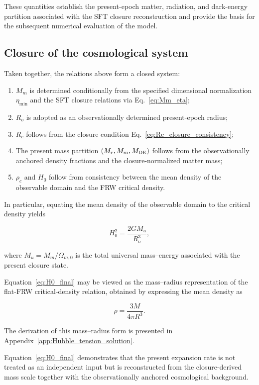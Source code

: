\documentclass[12pt]{article}
\begin{document}
These quantities establish the present-epoch matter, radiation, and
dark-energy partition associated with the SFT closure reconstruction and
provide the basis for the subsequent numerical evaluation of the model.


\subsection{Closure of the cosmological system}

Taken together, the relations above form a closed system:
\begin{enumerate}
\item $M_m$ is determined conditionally from the specified dimensional
normalization $\eta_{\min}$ and the SFT closure relations via
Eq.~\eqref{eq:Mm_eta};
\item $R_o$ is adopted as an observationally determined present-epoch
radius;
\item $R_c$ follows from the closure condition
Eq.~\eqref{eq:Rc_closure_consistency};
\item The present mass partition
\(
(M_r, M_m, M_{\rm DE})
\)
follows from the observationally anchored density fractions and the
closure-normalized matter mass;
\item \(\rho_c\) and \(H_0\) follow from consistency between the mean density
of the observable domain and the FRW critical density.

\end{enumerate}

In particular, equating the mean density of the observable domain to the
critical density yields

\begin{equation}
H_0^2 = \frac{2GM_u}{R_o^3},
\label{eq:H0_final}
\end{equation}

where $M_u = M_m/\Omega_{m,0}$ is the total universal mass--energy
associated with the present closure state.

Equation~\eqref{eq:H0_final} may be viewed as the mass--radius
representation of the flat-FRW critical-density relation, obtained by
expressing the mean density as

\[
\rho = \frac{3M}{4\pi R^3}.
\]

The derivation of this mass--radius form is presented in
Appendix~\ref{app:Hubble_tension_solution}.

Equation~\eqref{eq:H0_final} demonstrates that the present expansion
rate is not treated as an independent input but is reconstructed from
the closure-derived mass scale together with the observationally
anchored cosmological background.
\end{document}
